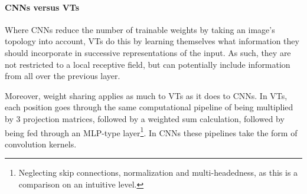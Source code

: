 





\paragraph{CNNs versus VTs}
Where CNNs reduce the number of trainable weights by taking an image's topology into account, VTs do this by learning themselves what information they should incorporate in successive representations of the input. As such, they are not restricted to a local receptive field, but can potentially include information from all over the previous layer.

Moreover, weight sharing applies as much to VTs as it does to CNNs. In VTs, each position goes through the same computational pipeline of being multiplied by 3 projection matrices, followed by a weighted sum calculation, followed by being fed through an MLP-type layer\footnote{Neglecting skip connections, normalization and multi-headedness, as this is a comparison on an intuitive level.}. In CNNs these pipelines take the form of convolution kernels.

